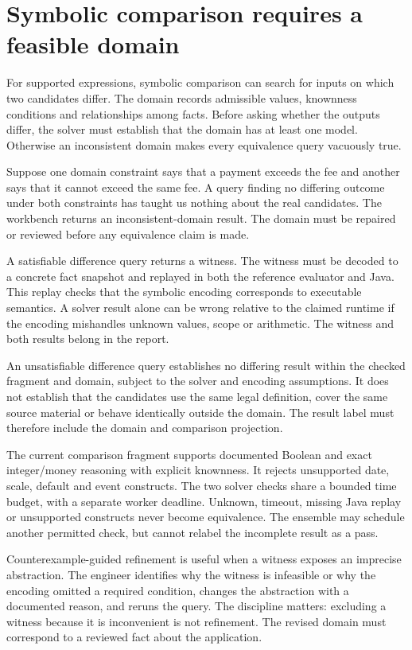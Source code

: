 \documentclass[12pt,a4paper,oneside,openany]{book}
\begin{document}
\section{Symbolic comparison requires a feasible domain}

For supported expressions, symbolic comparison can search for inputs on which two
candidates differ. The domain records admissible values, knownness conditions and
relationships among facts. Before asking whether the outputs differ, the solver
must establish that the domain has at least one model. Otherwise an inconsistent
domain makes every equivalence query vacuously true.

Suppose one domain constraint says that a payment exceeds the fee and another
says that it cannot exceed the same fee. A query finding no differing outcome
under both constraints has taught us nothing about the real candidates. The
workbench returns an inconsistent-domain result. The domain must be repaired or
reviewed before any equivalence claim is made.

A satisfiable difference query returns a witness. The witness must be decoded to
a concrete fact snapshot and replayed in both the reference evaluator and Java.
This replay checks that the symbolic encoding corresponds to executable semantics.
A solver result alone can be wrong relative to the claimed runtime if the
encoding mishandles unknown values, scope or arithmetic. The witness and both
results belong in the report.

An unsatisfiable difference query establishes no differing result within the
checked fragment and domain, subject to the solver and encoding assumptions. It
does not establish that the candidates use the same legal definition, cover the
same source material or behave identically outside the domain. The result label
must therefore include the domain and comparison projection.

The current comparison fragment supports documented Boolean and exact
integer/money reasoning with explicit knownness. It rejects unsupported date,
scale, default and event constructs. The two solver checks share a bounded time
budget, with a separate worker deadline. Unknown, timeout, missing Java replay or
unsupported constructs never become equivalence. The ensemble may schedule
another permitted check, but cannot relabel the incomplete result as a pass.

Counterexample-guided refinement is useful when a witness exposes an imprecise
abstraction. The engineer identifies why the witness is infeasible or why the
encoding omitted a required condition, changes the abstraction with a documented
reason, and reruns the query. The discipline matters: excluding a witness because
it is inconvenient is not refinement. The revised domain must correspond to a
reviewed fact about the application.
\end{document}
